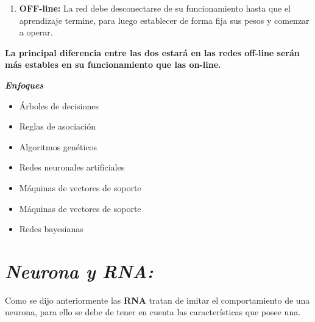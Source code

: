 \documentclass[journal]{IEEEtran}
\begin{document}
\begin{itemize}
\begin{enumerate}
\item \textbf{OFF-line:}
La red debe desconectarse de su funcionamiento hasta que el aprendizaje termine, para luego establecer de forma fija sus pesos y comenzar a operar.
\end{enumerate}

\begin{center}
\textbf{La principal diferencia entre las dos estará en las redes off-line serán más estables en su funcionamiento que las on-line.}
\end{center}
		
\textbf{\emph{Enfoques}}
\begin{itemize}
\item Árboles de decisiones
\item Reglas de asociación
\item Algoritmos genéticos
\item Redes neuronales artificiales
\item Máquinas de vectores de soporte
\item Máquinas de vectores de soporte
\item Redes bayesianas
\end{itemize}
\end{itemize}
  
\section{\textbf{\emph{Neurona y RNA:}}}

Como se dijo anteriormente las \textbf{RNA} tratan de imitar el comportamiento de una neurona, para ello se debe de tener en cuenta las características que posee una.
    
\end{document}
